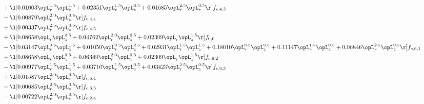 \begin{alignat}{2}
& + \l[  0.01003 \opL_r^{1.5} \opL_z^{1.5} +  0.02351 \opL_r^{1.5} \opL_z^{0.5} +  0.01685 \opL_r^{2.5} \opL_z^{0.5}  \r] f_{c,4,3} \nonumber \\ 
& - \l[  0.00879 \opL_r^{2.0} \opL_z^{0.5}  \r] f_{c,4,4} \nonumber \\ 
& + \l[  0.00337 \opL_r^{2.5} \opL_z^{0.5}  \r] f_{c,4,5} \nonumber \\ 
& + \l[  0.08658 \opL_r \opL_z^{0.5} +  0.04762 \opL_r^{2.0} \opL_z^{0.5} +  0.02309 \opL_r \opL_z^{1.5}  \r] f_{6,0} \nonumber \\ 
& - \l[  0.03147 \opL_r^{0.5} \opL_z^{1.5} +  0.01050 \opL_r^{0.5} \opL_z^{2.5} +  0.02931 \opL_r^{1.5} \opL_z^{1.5} +  0.18010 \opL_r^{0.5} \opL_z^{0.5} +  0.11147 \opL_r^{1.5} \opL_z^{0.5} +  0.06846 \opL_r^{2.5} \opL_z^{0.5}  \r] f_{c,6,1} \nonumber \\ 
& + \l[  0.08658 \opL_r \opL_z^{0.5} +  0.06349 \opL_r^{2.0} \opL_z^{0.5} +  0.02309 \opL_r \opL_z^{1.5}  \r] f_{c,6,2} \nonumber \\ 
& - \l[  0.00977 \opL_r^{1.5} \opL_z^{1.5} +  0.03716 \opL_r^{1.5} \opL_z^{0.5} +  0.03423 \opL_r^{2.5} \opL_z^{0.5}  \r] f_{c,6,3} \nonumber \\ 
& + \l[  0.01587 \opL_r^{2.0} \opL_z^{0.5}  \r] f_{c,6,4} \nonumber \\ 
& - \l[  0.00685 \opL_r^{2.5} \opL_z^{0.5}  \r] f_{c,6,5} \nonumber \\ 
& - \l[  0.00722 \opL_r^{2.0} \opL_z^{0.5}  \r] f_{c,2,4} \nonumber \\ 
\end{alignat} 


